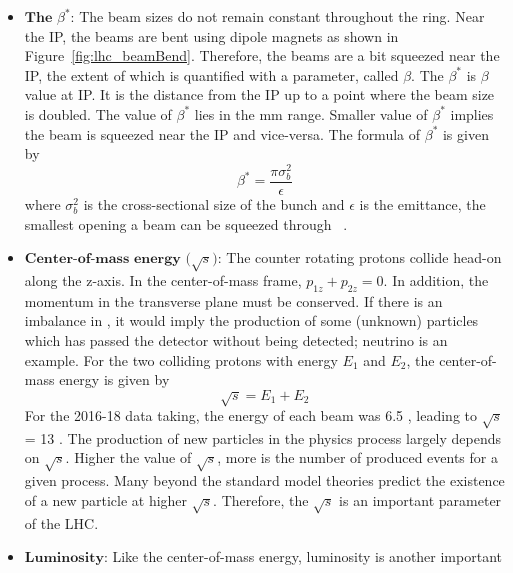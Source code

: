 \begin{itemize}[leftmargin=*]
\begin{figure}
      	\caption{The bunch configuration and crossing angle. The bunches are separated 
		by 7.5\unit{m}. The crossing angle shown is exaggerated for illustration.
		Figure~\ref{subfig:lhc_bunchConf} is adopted from \cite{CMSDAS} and 
		Figure~\ref{subfig:lhc_xangle} is taken from \cite{Mike}.}
    	\label{subfig:lhc_bunch_xangle}
      	\end{figure}
\item $\textbf{The $\beta^*$}$: The beam sizes do not remain constant throughout the 
	ring. Near the IP, the beams are bent using dipole magnets as shown in 
	Figure~\ref{fig:lhc_beamBend}. Therefore, the beams are a bit squeezed near the IP,  
	the extent of which is quantified with a parameter, called $\beta$. 
	The $\beta^*$ is $\beta$ value at IP. It is the distance from the IP up to a point 
	where the beam size is doubled. 
	The value of $\beta^*$ lies in the \unit{mm} range. Smaller value of $\beta^*$ 
	implies the beam is squeezed near the IP and vice-versa. The formula of $\beta^*$ 
	is given by~\cite{Baird:1017689}
     	\begin{equation}
     		\beta^* = \frac{\pi \sigma^2_{b}}{\epsilon}
     	\end{equation}
     	where $\sigma^2_{b}$ is the cross-sectional size of the bunch and 
	$\epsilon$ is the emittance, the smallest opening a beam
	can be squeezed through ~\cite{Baird:1017689}.
\item $\textbf{Center-of-mass energy ($\sqrt{s}$)}$: The counter rotating protons 
	collide head-on along the z-axis. In the center-of-mass frame, 
	$p_{1z} + p_{2z} = 0$. In addition, the momentum in the transverse plane must be conserved.
	If there is an imbalance in \pt, it would imply the production of some (unknown) particles 
	which has passed the detector without being detected; neutrino is an example. For the two 
	colliding protons with energy $E_1$ and $E_2$, the center-of-mass energy is given by 
	\begin{equation}
		\sqrt{s} = E_1 + E_2
	\end{equation}
     	For the 2016-18 data taking, the energy of each beam was 6.5 \TeV, leading to 
	$\sqrt{s}$ = 13 \TeV. The production of new particles in the physics
	process largely depends on $\sqrt{s}$. Higher the value of $\sqrt{s}$, more is
	the number of produced events for a given process. Many beyond the standard model 
	theories predict the existence of a new particle at higher $\sqrt{s}$. Therefore, 
	the $\sqrt{s}$ is an important parameter of the LHC.
\item $\textbf{Luminosity}$: Like the center-of-mass energy, luminosity is another important 

\end{itemize}
